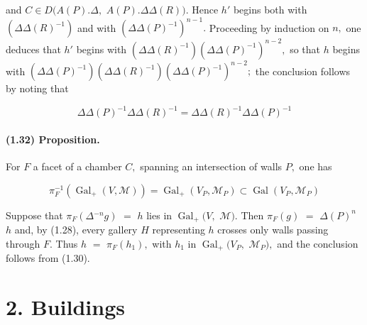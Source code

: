 \documentclass[10pt,a4paper]{article}
\begin{document}

and \ensuremath{C\in{}D(A(P).\Delta{},} \ensuremath{A(P).\Delta{}\Delta{}(R)).} Hence \ensuremath{h'} begins both with \ensuremath{(\Delta{}\Delta{}(R)^{-1})} and with \ensuremath{(\Delta{}\Delta{}(P)^{-1})^{n-1}.} Proceeding by induction on \ensuremath{n,} one deduces that \ensuremath{h'} begins with \ensuremath{(\Delta{}\Delta{}(R)^{-1})(\Delta{}\Delta{}(P)^{-1})^{n-2},} so that \ensuremath{h} begins with \ensuremath{(\Delta{}\Delta{}(P)^{-1})(\Delta{}\Delta{}(R)^{-1})(\Delta{}\Delta{}(P)^{-1})^{n-2};} the conclusion follows by noting that\par

\[
\Delta{}\Delta{}(P)^{-1} \Delta{}\Delta{}(R)^{-1} = \Delta{}\Delta{}(R)^{-1} \Delta{}\Delta{}(P)^{-1}
\]

\paragraph{(1.32) Proposition.} For \ensuremath{F} a facet of a chamber \ensuremath{C,} spanning an intersection of walls \ensuremath{P,} one has

\[
\pi{}_F^{-1}(\operatorname{Gal}_+(V, \mathcal{M})) = \operatorname{Gal}_+(V_P, \mathcal{M}_P) \subset{} \operatorname{Gal}(V_P, \mathcal{M}_P)
\]

Suppose that \ensuremath{\pi{}_F(\Delta{}^{-n}g)} \ensuremath{=} \ensuremath{h} lies in \ensuremath{\operatorname{Gal}_+(V,} \ensuremath{\mathcal{M}).} Then \ensuremath{\pi{}_F(g)} \ensuremath{=} \ensuremath{\Delta{}(P)^n} \ensuremath{h} and, by (1.28), every gallery \ensuremath{H} representing \ensuremath{h} crosses only walls passing through \ensuremath{F.} Thus \ensuremath{h} \ensuremath{=} \ensuremath{\pi{}_F(h_1),} with \ensuremath{h_1} in \ensuremath{\operatorname{Gal}_+(V_P,} \ensuremath{\mathcal{M}_P),} and the conclusion follows from (1.30).\par

\section*{2. Buildings}
\end{document}
